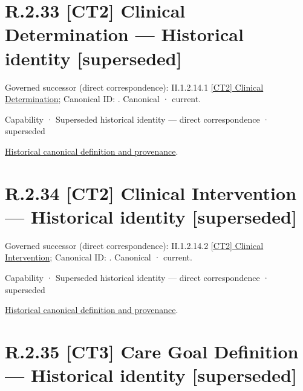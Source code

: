 \section*{R.2.33 [CT2] Clinical Determination — Historical identity [superseded]}
\label{navigation:R.2.33}

{\small Governed successor (direct correspondence): II.1.2.14.1 \hyperref[element:39219464b6304b59bd7c3de4e237066e]{[CT2] Clinical Determination}; Canonical ID: \texttt{}. Canonical · current.}\par
\label{element:018ccd818ec142fba1ffb086d900acc6}
{\small Capability · Superseded historical identity — direct correspondence · superseded}\par
\href{../../../../continuum/strategy/capability/018ccd818ec142fba1ffb086d900acc6.md}{Historical canonical definition and provenance}.\par
\section*{R.2.34 [CT2] Clinical Intervention — Historical identity [superseded]}
\label{navigation:R.2.34}

{\small Governed successor (direct correspondence): II.1.2.14.2 \hyperref[element:5359d1b0ff814a0e871384469f5ebcd7]{[CT2] Clinical Intervention}; Canonical ID: \texttt{}. Canonical · current.}\par
\label{element:958345ee65f446d3b1259b8895ab100f}
{\small Capability · Superseded historical identity — direct correspondence · superseded}\par
\href{../../../../continuum/strategy/capability/958345ee65f446d3b1259b8895ab100f.md}{Historical canonical definition and provenance}.\par
\section*{R.2.35 [CT3] Care Goal Definition — Historical identity [superseded]}
\label{navigation:R.2.35}

